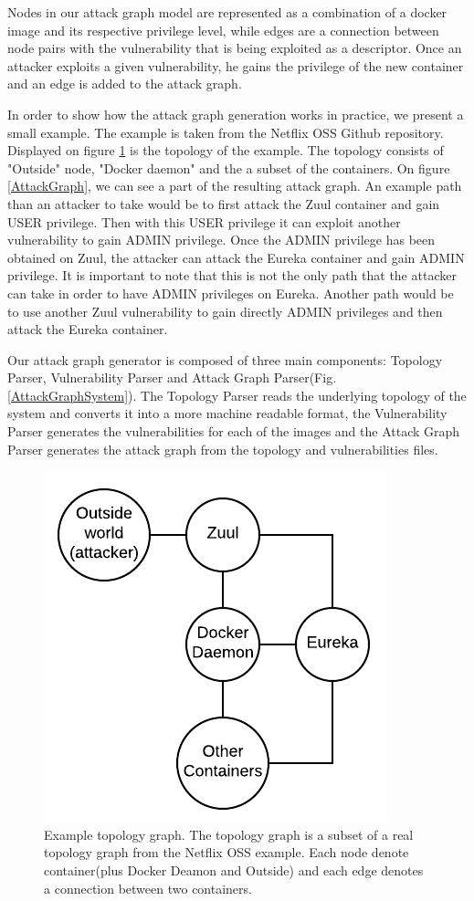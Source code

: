 \documentclass[letterpaper, 10 pt, conference]{ieeeconf}  %
\begin{document}
Nodes in our attack graph model are represented as a combination of a docker image and its respective privilege level, while edges are a connection between node pairs with the vulnerability that is being exploited as a descriptor. Once an attacker exploits a given vulnerability, he gains the privilege of the new container and an edge is added to the attack graph.

In order to show how the attack graph generation works in practice, we present a small example. The example is taken from the Netflix OSS Github repository. Displayed on figure \ref{TopologyGraph} is the topology of the example. The topology consists of "Outside" node, "Docker daemon" and the a subset of the containers. On figure \ref{AttackGraph}, we can see a part of the resulting attack graph. An example path than an attacker to take would be to first attack the Zuul container and gain USER privilege. Then with this USER privilege it can exploit another vulnerability to gain ADMIN privilege. Once the ADMIN privilege has been obtained on Zuul, the attacker can attack the Eureka container and gain ADMIN privilege. It is important to note that this is not the only path that the attacker can take in order to have ADMIN privileges on Eureka. Another path would be to use another Zuul vulnerability to gain directly ADMIN privileges and then attack the Eureka container.

Our attack graph generator is composed of three main components: Topology Parser, Vulnerability Parser and Attack Graph Parser(Fig. \ref{AttackGraphSystem}). The Topology Parser reads the underlying topology of the system and converts it into a more machine readable format, the Vulnerability Parser generates the vulnerabilities for each of the images and the Attack Graph Parser generates the attack graph from the topology and vulnerabilities files. 

\begin{figure}
	\includegraphics[]{Topology_graph}
	\caption{Example topology graph. The topology graph is a subset of a real topology graph from the Netflix OSS example. Each node denote container(plus Docker Deamon and Outside) and each edge denotes a connection between two containers.}
	\label{TopologyGraph}
\end{figure}
\end{document}
